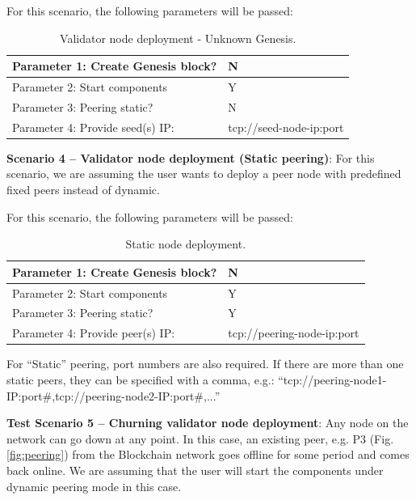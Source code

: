 For this scenario, the following parameters will be passed:
\begin{table}[H]
\centering
\label{tab:node_n_install2}
\begin{tabular}{|l|l|}
\hline
Parameter 1: Create Genesis block? & N                          \\ \hline
Parameter 2: Start components      & Y                          \\ \hline
Parameter 3: Peering static?       & N                          \\ \hline
Parameter 4: Provide seed(s) IP:   & tcp://seed-node-ip:port    \\ \hline
\end{tabular}
\caption{Validator node deployment - Unknown Genesis.}
\vspace{-4mm}
\end{table}

\textbf{Scenario 4 – Validator node deployment (Static peering)}: 
For this scenario, we are assuming the user wants to deploy a peer node with predefined fixed peers instead of dynamic. 

For this scenario, the following parameters will be passed:
\begin{table}[H]
\centering
\label{tab:node_n_install2}
\begin{tabular}{|l|l|}
\hline
Parameter 1: Create Genesis block? & N                          \\ \hline
Parameter 2: Start components      & Y                          \\ \hline
Parameter 3: Peering static?       & Y                          \\ \hline
Parameter 4: Provide peer(s) IP:   & tcp://peering-node-ip:port \\ \hline
\end{tabular}
\caption{Static node deployment.}
\vspace{-4mm}
\end{table}

For ``Static'' peering, port numbers are also required. If there are more than one static peers, they can be specified with a comma, e.g.: ``tcp://peering-node1-IP:port\#,tcp://peering-node2-IP:port\#,...''

\textbf{Test Scenario 5 – Churning validator node deployment}: 
Any node on the network can go down at any point. In this case, an existing peer, e.g. P3 (Fig. \ref{fig:peering}) from the Blockchain network goes offline for some period and comes back online. We are assuming that the user will start the components under dynamic peering mode in this case.

